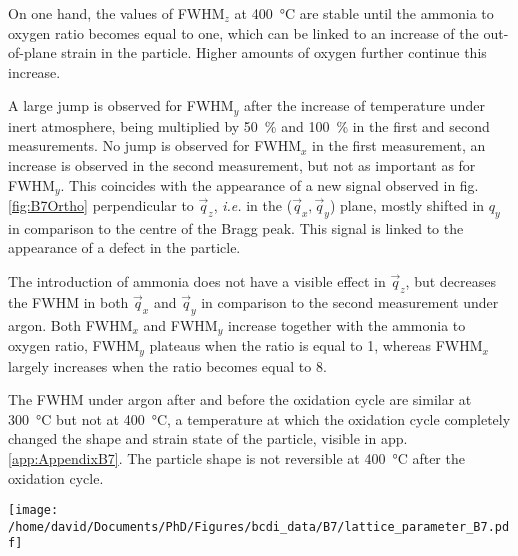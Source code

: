 On one hand, the values of FWHM$_z$ at \qty{400}{\degreeCelsius} are stable until the ammonia to oxygen ratio becomes equal to one, which can be linked to an increase of the out-of-plane strain in the particle.
Higher amounts of oxygen further continue this increase.

A large jump is observed for FWHM$_y$ after the increase of temperature under inert atmosphere, being multiplied by \qty{50}{\percent} and \qty{100}{\percent} in the first and second measurements.
No jump is observed for FWHM$_x$ in the first measurement, an increase is observed in the second measurement, but not as important as for FWHM$_y$.
This coincides with the appearance of a new signal observed in fig. \ref{fig:B7Ortho} perpendicular to $\vec{q}_z$, \textit{i.e.} in the ($\vec{q}_x, \vec{q}_y$) plane, mostly shifted in $q_y$ in comparison to the centre of the Bragg peak.
This signal is linked to the appearance of a defect in the particle.

The introduction of ammonia does not have a visible effect in $\vec{q}_z$, but decreases the FWHM in both $\vec{q}_x$ and $\vec{q}_y$ in comparison to the second measurement under argon.
Both FWHM$_x$ and FWHM$_y$ increase together with the ammonia to oxygen ratio, FWHM$_y$ plateaus when the ratio is equal to 1, whereas FWHM$_x$ largely increases when the ratio becomes equal to 8.

The FWHM under argon after and before the oxidation cycle are similar at \qty{300}{\degreeCelsius} but not at \qty{400}{\degreeCelsius}, a temperature at which the oxidation cycle completely changed the shape and strain state of the particle, visible in app. \ref{app:AppendixB7}.
The particle shape is not reversible at \qty{400}{\degreeCelsius} after the oxidation cycle.

\begin{SCfigure}
    \centering
    \texttt{[image: /home/david/Documents/PhD/Figures/bcdi\_data/B7/lattice\_parameter\_B7.pdf]}
    \caption{
        Evolution of the interplanar spacing $d_{111}$ and homogeneous strain $\epsilon_{111, homo}$ for particle B as a function of the ammonia to oxygen ratio.
        The reference for the computation of $\epsilon_{111, homo}$ was taken as the mean value at \qty{25}{\degreeCelsius}.
        The reproduction of measurements at fixed conditions yields multiple data points, lines at \qty{300}{\degreeCelsius} and \qty{400}{\degreeCelsius} link the data points in the order of the measurements.
    }
    \label{fig:B7Latpara}
\end{SCfigure}

